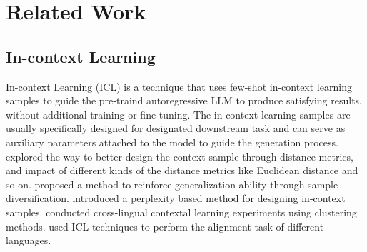 \section{Related Work}
\subsection{In-context Learning}
In-context Learning (ICL) \cite{gpt-3-brown2020language,icl0-dong2022survey} is a technique that uses few-shot in-context learning samples to guide the pre-traind autoregressive LLM to produce satisfying results, without additional training or fine-tuning. The in-context learning samples are usually specifically designed for designated downstream task and can serve as auxiliary parameters attached to the model to guide the generation process. \citet{icl1-liu2021makes} explored the way to better design the context sample through distance metrics, and impact of different kinds of the distance metrics like Euclidean distance and so on. \citet{icl5-levy2022diverse} proposed a method to reinforce generalization ability through sample diversification. \citet{icl4-chung2024scaling} introduced a perplexity based method for designing in-context samples. \citet{icl2-sorensen2022information} conducted cross-lingual contextal learning experiments using clustering methods. \citet{icl3-tanwar2023multilingual} used ICL techniques to perform the alignment task of different languages.

